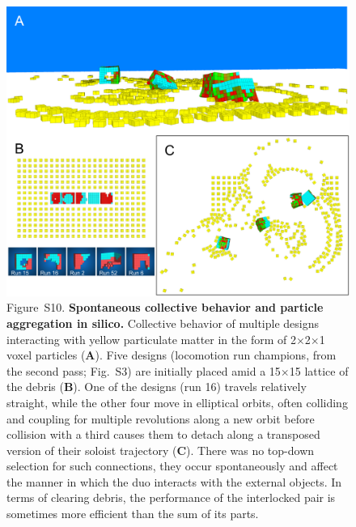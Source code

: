 \begin{figure}[t]
\centering
\includegraphics[width=\linewidth]{Chapter07/img/SupplementalCollectiveBehavior.png}
\caption*{Figure~S10.  \textbf{Spontaneous collective behavior and particle aggregation in silico.} 
Collective behavior of multiple designs interacting with yellow particulate matter in the form of 2{$\times$}2{$\times$}1 voxel particles (\textbf{A}).  
Five designs (locomotion run champions, from the second pass; Fig.~S3) are initially placed amid a 15{$\times$}15 lattice of the debris (\textbf{B}). 
One of the designs (run 16) travels relatively straight, while the other four move in elliptical orbits, often colliding and coupling for multiple revolutions along a new orbit before collision with a third causes them to detach along a transposed version of their soloist trajectory (\textbf{C}). 
There was no top-down selection for such connections, they occur spontaneously and affect the manner in which the duo interacts with the external objects. 
In terms of clearing debris, the performance of the interlocked pair is sometimes more efficient than the sum of its parts.
}
\end{figure}
 

